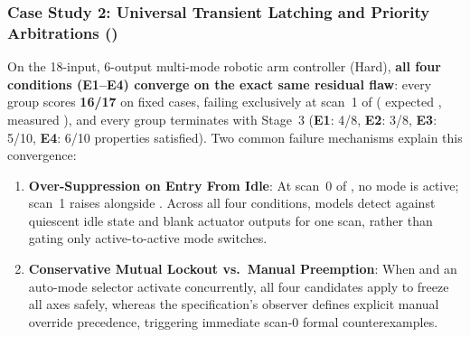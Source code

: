 \subsubsection{Case Study 2: Universal Transient Latching and Priority Arbitrations ()}
On the 18-input, 6-output multi-mode robotic arm controller  (Hard), \textbf{all four conditions (\textbf{E1}--\textbf{E4}) converge on the exact same residual flaw}: every group scores \textbf{16/17} on fixed cases, failing exclusively at scan~1 of  ( expected , measured ), and every group terminates with Stage~3  (\textbf{E1}: 4/8, \textbf{E2}: 3/8, \textbf{E3}: 5/10, \textbf{E4}: 6/10 properties satisfied). Two common failure mechanisms explain this convergence:
\begin{enumerate}
  \item \textbf{Over-Suppression on Entry From Idle}: At scan~0 of , no mode is active; scan~1 raises  alongside . Across all four conditions, models detect  against quiescent idle state and blank actuator outputs for one scan, rather than gating only active-to-active mode switches.
  \item \textbf{Conservative Mutual Lockout vs.\ Manual Preemption}: When  and an auto-mode selector activate concurrently, all four candidates apply  to freeze all axes safely, whereas the specification's observer defines explicit manual override precedence, triggering immediate scan-0 formal counterexamples.
\end{enumerate}

